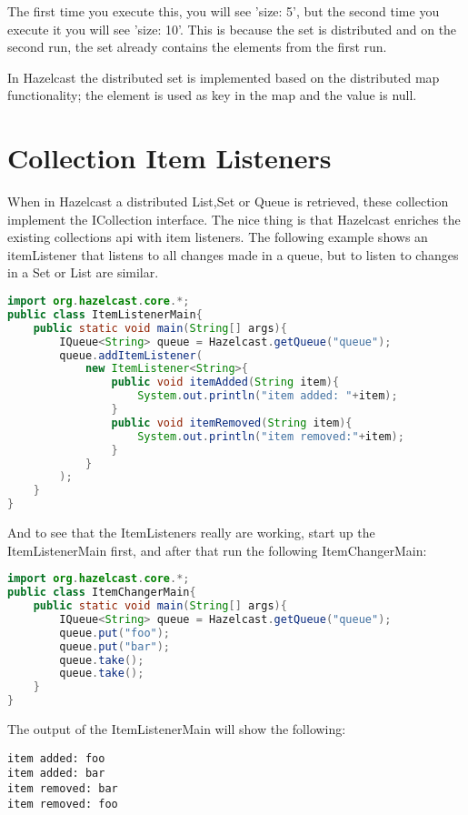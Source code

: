 The first time you execute this, you will see 'size: 5', but the second time you execute it you will see 'size: 10'. This is because the
set is distributed and on the second run, the set already contains the elements from the first run.

In Hazelcast the distributed set is implemented based on the distributed map functionality; the element is used as key in the map and the
value is null. 

\section{Collection Item Listeners}

When in Hazelcast a distributed List,Set or Queue is retrieved, these collection implement
the ICollection interface. The nice thing is that Hazelcast enriches the existing collections api
with item listeners. The following example shows an itemListener that listens to all changes made
in a queue, but to listen to changes in a Set or List are similar.

\begin{lstlisting}[language=java]
import org.hazelcast.core.*;	
public class ItemListenerMain{
    public static void main(String[] args){
        IQueue<String> queue = Hazelcast.getQueue("queue");
        queue.addItemListener(
            new ItemListener<String>{
                public void itemAdded(String item){
                    System.out.println("item added: "+item);
                }
                public void itemRemoved(String item){ 
                    System.out.println("item removed:"+item);
                }
            }
        );
    }
}
\end{lstlisting}

And to see that the ItemListeners really are working, start up the ItemListenerMain
first, and after that run the following ItemChangerMain:

\begin{lstlisting}[language=java]
import org.hazelcast.core.*;	
public class ItemChangerMain{
    public static void main(String[] args){
        IQueue<String> queue = Hazelcast.getQueue("queue");
        queue.put("foo");
        queue.put("bar");
        queue.take();
        queue.take();
    }
}
\end{lstlisting}

The output of the ItemListenerMain will show the following:
\begin{verbatim}
item added: foo
item added: bar
item removed: bar
item removed: foo
\end{verbatim}

